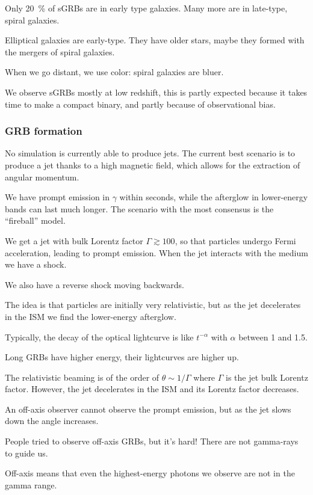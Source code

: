 \documentclass[main.tex]{subfiles}
\begin{document}
Only \SI{20}{\percent} of sGRBs are in early type galaxies. 
Many more are in late-type, spiral galaxies. 

Elliptical galaxies are early-type. 
They have older stars, maybe they formed with the mergers of spiral galaxies. 

When we go distant, we use color: spiral galaxies are bluer. 

We observe sGRBs mostly at low redshift, this is partly expected 
because it takes time to make a compact binary, 
and partly because of observational bias. 

\subsubsection{GRB formation}

No simulation is currently able to produce jets. 
The current best scenario is to produce a jet thanks to a high magnetic field,
which allows for the extraction of angular momentum. 

We have prompt emission in \(\gamma \) within seconds, while the afterglow in lower-energy
bands can last much longer. 
The scenario with the most consensus is the ``fireball'' model. 

We get a jet with bulk Lorentz factor \(\Gamma \gtrsim 100\), so that 
particles undergo Fermi acceleration, leading to prompt emission. 
When the jet interacts with the medium we have a shock. 

We also have a reverse shock moving backwards.

The idea is that particles are initially very relativistic, but as the jet decelerates
in the ISM we find the lower-energy afterglow.

Typically, the decay of the optical lightcurve is like \(t^{-\alpha }\) with \(\alpha \) between 
1 and 1.5. 

Long GRBs have higher energy, their lightcurves are higher up. 

The relativistic beaming is of the order of \(\theta \sim 1 / \Gamma \) where \(\Gamma \) is 
the jet bulk Lorentz factor. 
However, the jet decelerates in the ISM and its Lorentz factor decreases. 

An off-axis observer cannot observe the prompt emission, but as the jet slows down 
the angle increases. 

People tried to observe off-axis GRBs, but it's hard! There are not gamma-rays to 
guide us. 

Off-axis means that even the highest-energy photons we observe are not in the gamma range. 
\end{document}
